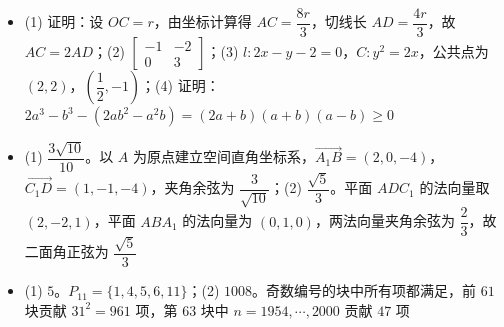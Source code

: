 \begin{itemize}[leftmargin=2.6em]
  \item[\textbf{21.}] (1) 证明：设 $OC=r$，由坐标计算得 $AC=\dfrac{8r}{3}$，切线长 $AD=\dfrac{4r}{3}$，故 $AC=2AD$；(2) $\begin{bmatrix}-1&-2\\0&3\end{bmatrix}$；(3) $l:2x-y-2=0$，$C:y^2=2x$，公共点为 $(2,2)$，$\left(\dfrac12,-1\right)$；(4) 证明：$2a^3-b^3-(2ab^2-a^2b)=(2a+b)(a+b)(a-b)\geqslant0$
  \item[\textbf{22.}] (1) $\dfrac{3\sqrt{10}}{10}$。以 $A$ 为原点建立空间直角坐标系，$\overrightarrow{A_1B}=(2,0,-4)$，$\overrightarrow{C_1D}=(1,-1,-4)$，夹角余弦为 $\dfrac{3}{\sqrt{10}}$；(2) $\dfrac{\sqrt5}{3}$。平面 $ADC_1$ 的法向量取 $(2,-2,1)$，平面 $ABA_1$ 的法向量为 $(0,1,0)$，两法向量夹角余弦为 $\dfrac23$，故二面角正弦为 $\dfrac{\sqrt5}{3}$
  \item[\textbf{23.}] (1) $5$。$P_{11}=\{1,4,5,6,11\}$；(2) $1008$。奇数编号的块中所有项都满足，前 $61$ 块贡献 $31^2=961$ 项，第 $63$ 块中 $n=1954,\cdots,2000$ 贡献 $47$ 项
\end{itemize}
